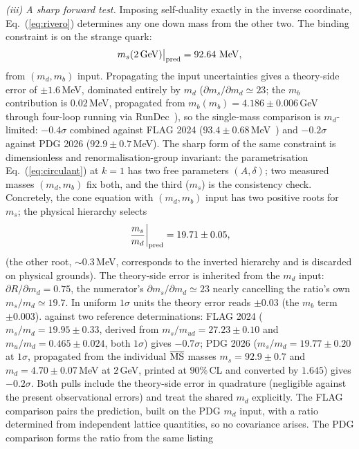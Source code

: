 \documentclass[11pt]{article}
\begin{document}
\emph{(iii) A sharp forward test.} Imposing self-duality exactly in the inverse
coordinate, Eq.~(\ref{eq:rivero}) determines any one down mass from the other two.
The binding constraint is on the strange quark:
\begin{equation}
m_s(2\,\mathrm{GeV})\big|_{\rm pred} = 92.64\ \mathrm{MeV},
\end{equation}
from $(m_d, m_b)$ input. Propagating the input uncertainties gives a theory-side error of $\pm1.6$\,MeV, dominated entirely by $m_d$
($\partial m_s/\partial m_d \simeq 23$; the $m_b$ contribution is $0.02$\,MeV, propagated from $m_b(m_b) = 4.186\pm0.006$\,GeV through four-loop running via RunDec~\cite{CRunDec}), so the single-mass comparison is $m_d$-limited: $-0.4\sigma$
combined against FLAG 2024 ($93.4\pm0.68$\,MeV~\cite{FLAG}) and $-0.2\sigma$
against PDG 2026 ($92.9\pm0.7$\,MeV). The sharp form of the same constraint is
dimensionless and renormalisation-group invariant: the parametrisation Eq.~(\ref{eq:circulant}) at $k=1$ has two free parameters $(A, \delta)$; two measured masses $(m_d, m_b)$ fix both, and the third ($m_s$) is the consistency check. Concretely, the cone equation with $(m_d, m_b)$ input has two
positive roots for $m_s$; the physical hierarchy selects
\begin{equation}
\left.\frac{m_s}{m_d}\right|_{\rm pred} = 19.71\pm0.05,
\label{eq:ratio}
\end{equation}
(the other root, $\sim 0.3$\,MeV, corresponds to the inverted hierarchy and is
discarded on physical grounds). The theory-side error is inherited from the
$m_d$ input: $\partial R/\partial m_d = 0.75$, the numerator's
$\partial m_s/\partial m_d \simeq 23$ nearly cancelling the ratio's own
$m_s/m_d \simeq 19.7$. In uniform
$1\sigma$ units the theory error reads $\pm0.03$ (the $m_b$ term
$\pm0.003$).
against two reference determinations: FLAG 2024
($m_s/m_d = 19.95\pm0.33$, derived from $m_s/m_{ud} = 27.23\pm0.10$ and
$m_u/m_d = 0.465\pm0.024$, both $1\sigma$) gives $-0.7\sigma$; PDG 2026
($m_s/m_d = 19.77\pm0.20$ at $1\sigma$, propagated from the individual
$\overline{\rm MS}$ masses $m_s = 92.9\pm0.7$ and $m_d = 4.70\pm0.07$\,MeV
at $2$\,GeV, printed at $90\%$\,CL and converted by $1.645$) gives
$-0.2\sigma$.
Both pulls include the theory-side error in quadrature (negligible against
the present observational errors) and treat the shared $m_d$ explicitly.
The FLAG comparison pairs the prediction, built on the PDG $m_d$ input,
with a ratio determined from independent lattice quantities, so no
covariance arises. The PDG comparison forms the ratio from the same listing
\end{document}
